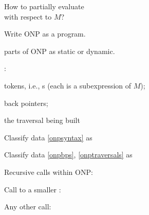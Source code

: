 \documentclass[12pt,fleqn,landscape]{article}
\begin{document}

\begin{slide}{How to partially evaluate \\ with respect to $M$?}


\be

\item Write ONP as a program. \vair

\item {}  parts of ONP   as static or dynamic.

: 
\be
\item\label{onpsyntax} tokens, i.e., {\lexp}s \hfill (each is a subexpression of $M$);
\item\label{onpbps} back pointers;
\item\label{onptraversals} the traversal being built
\ee
\vair

\item Classify data \ref{onpsyntax} as   \hfill {}
\vair

\item Classify data \ref{onpbps},  \ref{onptraversals} as 
\vair

\item Recursive calls within ONP:
\bi
\item Call to a smaller \lexp:  \hfill {} 

\item Any other call:  \hfill  {} 
\ei

\ee


\end{slide}




\end{document}
